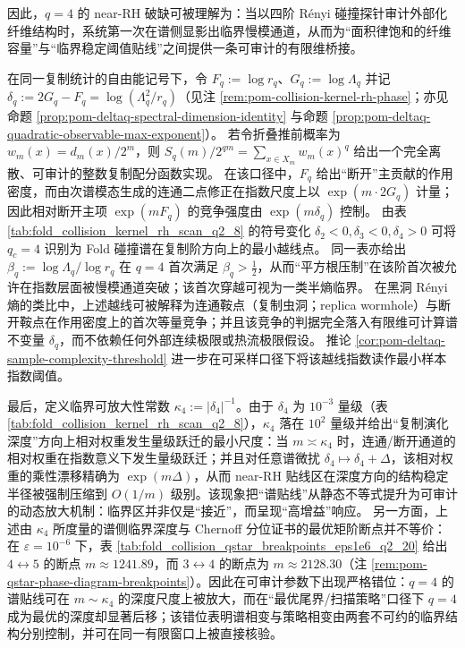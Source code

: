 \par
因此，\(q=4\) 的 near-RH 破缺可被理解为：当以四阶 Rényi 碰撞探针审计外部化纤维结构时，系统第一次在谱侧显影出临界慢模通道，从而为“面积律饱和的纤维容量”与“临界稳定阈值贴线”之间提供一条可审计的有限维桥接。
\par
在同一复制统计的自由能记号下，令 \(F_q:=\log r_q\)、\(G_q:=\log\Lambda_q\) 并记
\(\delta_q:=2G_q-F_q=\log(\Lambda_q^2/r_q)\)（见注 \ref{rem:pom-collision-kernel-rh-phase}；亦见命题 \ref{prop:pom-deltaq-spectral-dimension-identity} 与命题 \ref{prop:pom-deltaq-quadratic-observable-max-exponent}）。
若令折叠推前概率为 \(w_m(x)=d_m(x)/2^m\)，则
\(
S_q(m)/2^{qm}=\sum_{x\in X_m}w_m(x)^q
\)
给出一个完全离散、可审计的整数复制配分函数实现。
在该口径中，\(F_q\) 给出“断开”主贡献的作用密度，而由次谱模态生成的连通二点修正在指数尺度上以 \(\exp(m\cdot 2G_q)\) 计量；因此相对断开主项 \(\exp(mF_q)\) 的竞争强度由 \(\exp(m\delta_q)\) 控制。
由表 \ref{tab:fold_collision_kernel_rh_scan_q2_8} 的符号变化 \(\delta_2<0,\delta_3<0,\delta_4>0\) 可将 \(q_c=4\) 识别为 Fold 碰撞谱在复制阶方向上的最小越线点。
同一表亦给出 \(\beta_q:=\log\Lambda_q/\log r_q\) 在 \(q=4\) 首次满足 \(\beta_q>\tfrac12\)，从而“平方根压制”在该阶首次被允许在指数层面被慢模通道突破；该首次穿越可视为一类半熵临界。
在黑洞 Rényi 熵的类比中，上述越线可被解释为连通鞍点（复制虫洞；replica wormhole）与断开鞍点在作用密度上的首次等量竞争；并且该竞争的判据完全落入有限维可计算谱不变量 \(\delta_q\)，而不依赖任何外部连续极限或热流极限假设。
推论 \ref{cor:pom-deltaq-sample-complexity-threshold} 进一步在可采样口径下将该越线指数读作最小样本指数阈值。
\par
最后，定义临界可放大性常数 \(\kappa_4:=|\delta_4|^{-1}\)。由于 \(\delta_4\) 为 \(10^{-3}\) 量级（表 \ref{tab:fold_collision_kernel_rh_scan_q2_8}），\(\kappa_4\) 落在 \(10^2\) 量级并给出“复制演化深度”方向上相对权重发生量级跃迁的最小尺度：当 \(m\asymp \kappa_4\) 时，连通/断开通道的相对权重在指数意义下发生量级跃迁；并且对任意谱微扰 \(\delta_4\mapsto \delta_4+\Delta\)，该相对权重的乘性漂移精确为 \(\exp(m\Delta)\)，从而 near-RH 贴线区在深度方向的结构稳定半径被强制压缩到 \(O(1/m)\) 级别。该现象把“谱贴线”从静态不等式提升为可审计的动态放大机制：临界区并非仅是“接近”，而呈现“高增益”响应。
另一方面，上述由 \(\kappa_4\) 所度量的谱侧临界深度与 Chernoff 分位证书的最优矩阶断点并不等价：在 \(\varepsilon=10^{-6}\) 下，表 \ref{tab:fold_collision_qstar_breakpoints_eps1e6_q2_20} 给出 \(4\leftrightarrow 5\) 的断点 \(m\approx 1241.89\)，而 \(3\leftrightarrow 4\) 的断点为 \(m\approx 2128.30\)（注 \ref{rem:pom-qstar-phase-diagram-breakpoints}）。因此在可审计参数下出现严格错位：\(q=4\) 的谱贴线可在 \(m\sim\kappa_4\) 的深度尺度上被放大，而在“最优尾界/扫描策略”口径下 \(q=4\) 成为最优的深度却显著后移；该错位表明谱相变与策略相变由两套不可约的临界结构分别控制，并可在同一有限窗口上被直接核验。


